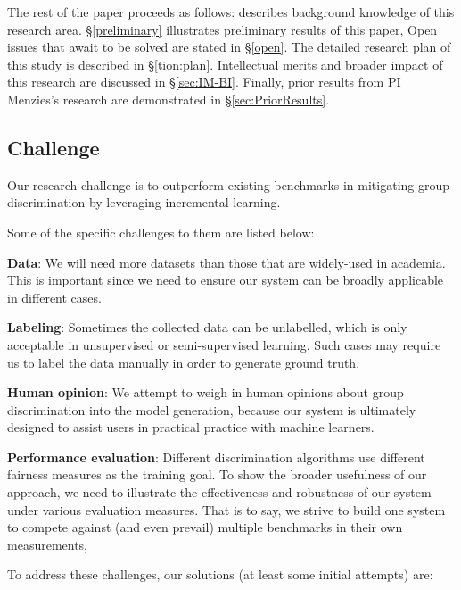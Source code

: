 The rest of the paper proceeds as follows:  describes background knowledge of this research area. \S\ref{preliminary} illustrates preliminary results of this paper, Open issues that await to be solved are stated in \S\ref{open}. The detailed research plan of this study is described in \S\ref{tion:plan}. Intellectual merits and broader impact of this research are discussed in \S\ref{sec:IM-BI}. Finally, prior results from PI Menzies's research are demonstrated in \S\ref{sec:PriorResults}.

\subsection{Challenge}\label{challenge}
Our research challenge is to outperform existing benchmarks in mitigating group discrimination by leveraging incremental learning.

Some of the specific challenges to them are listed below:
  
\bi
\item  {\bf  Data}: We will need more datasets than those that are widely-used in academia. This is important since we need to ensure our system can be broadly applicable in different cases. 
\item {\bf  Labeling}: Sometimes the collected data can be unlabelled, which is only acceptable in unsupervised or semi-supervised learning. Such cases may require us to label the data manually in order to generate ground truth.
\item  {\bf  Human opinion}: We attempt to weigh in human opinions about group discrimination into the model generation, because our system is ultimately designed to assist users in practical practice with machine learners. 
\item {\bf  Performance evaluation}: Different discrimination algorithms use different fairness measures as the training goal. To show the broader usefulness of our approach, we need to illustrate the effectiveness and robustness of our system under various evaluation measures. That is to say, we strive to build one system to compete against (and even prevail) multiple benchmarks in their own measurements,
\ei

To address these challenges, our solutions (at least some initial attempts) are:

